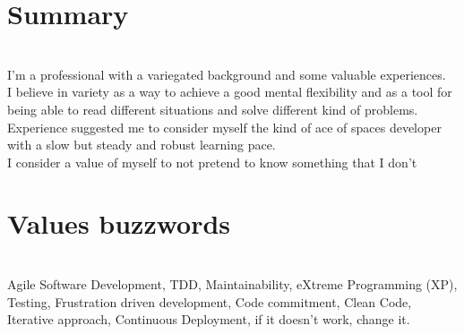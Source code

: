\documentclass[letterpaper]{twentysecondcv} %
\begin{document}

\section{Summary}\\
I'm a professional with a variegated background and some valuable experiences.\\
I believe in variety as a way to achieve a good mental flexibility and as a tool for being able to read different situations and solve different kind of problems.\\
Experience suggested me to consider myself the kind of ace of spaces developer with a slow but steady and robust learning pace.\\
I consider a value of myself to not pretend to know something that I don't\\


\section{Values buzzwords}\\
Agile Software Development, TDD, Maintainability, eXtreme Programming (XP), Testing, Frustration driven development, 
Code commitment, Clean Code, Iterative approach, Continuous Deployment, if it doesn't work, change it.








\end{document}
